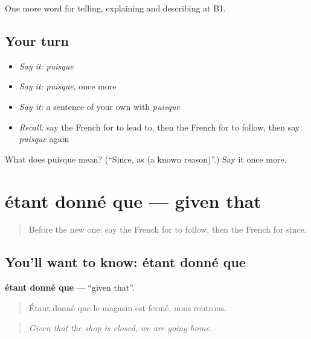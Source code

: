 \begin{grammarlens}[title={What you've built}]
One more word for telling, explaining and describing at B1.
\end{grammarlens}

\subsection*{Your turn}
\begin{itemize}
\raggedright
  \item \emph{Say it:} \emph{puisque}
  \item \emph{Say it:} \emph{puisque}, once more
  \item \emph{Say it:} a sentence of your own with \emph{puisque}
  \item \emph{Recall:} say the French for to lead to, then the French for to follow, then say \emph{puisque} again
\end{itemize}

\begin{tcolorbox}[breakable,colback=teal!4,colframe=teal!35!black,title={Before you move on}]
What does puisque mean? (\textquotedblleft{}Since, as (a known reason)\textquotedblright{}.) Say it once more.
\end{tcolorbox}
\section[étant donné que]{étant donné que — given that}

\label{lesson:FR-C347-etant-donne-que}



\begin{quote}
Before the new one: say the French for to follow, then the French for since.
\end{quote}

\subsection*{You'll want to know: étant donné que}
\textbf{étant donné que} — \textquotedblleft{}given that\textquotedblright{}.

\begin{quote}
Étant donné que le magasin est fermé, nous rentrons.
\end{quote}

\begin{quote}
\emph{Given that the shop is closed, we are going home.}
\end{quote}

